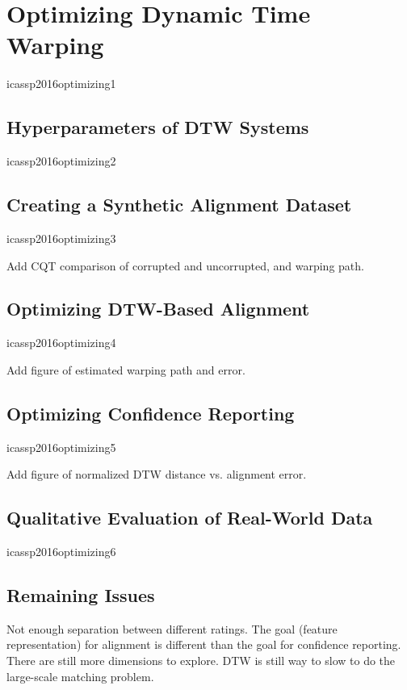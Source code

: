 \chapter{Optimizing Dynamic Time Warping}

icassp2016optimizing1

\section{Hyperparameters of DTW Systems}

icassp2016optimizing2

\section{Creating a Synthetic Alignment Dataset}

icassp2016optimizing3

Add CQT comparison of corrupted and uncorrupted, and warping path.

\section{Optimizing DTW-Based Alignment}

icassp2016optimizing4

Add figure of estimated warping path and error.

\section{Optimizing Confidence Reporting}

icassp2016optimizing5

Add figure of normalized DTW distance vs. alignment error.

\section{Qualitative Evaluation of Real-World Data}

icassp2016optimizing6

\section{Remaining Issues}

Not enough separation between different ratings.
The goal (feature representation) for alignment is different than the goal for confidence reporting.
There are still more dimensions to explore.
DTW is still way to slow to do the large-scale matching problem.

